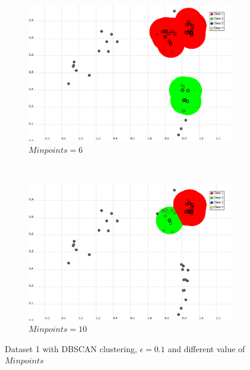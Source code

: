 \documentclass[a4paper,10pt]{article}
\begin{document}
\begin{figure}[H]
\begin{subfigure}[t]{0.2\textwidth}
      \includegraphics[width=\textwidth]{pictures/DBSCAN-epsilon01-Minpoint-6}
      \caption{$Minpoints = 6$}
      \label{fig:DBSCAN-epsilon01-Minpoint-6}
     \end{subfigure}
      ~
    \begin{subfigure}[t]{0.2\textwidth}
      \centering
      \includegraphics[width=\textwidth]{pictures/DBSCAN-epsilon01-Minpoint-10}
      \caption{$Minpoints = 10$}
      \label{fig:DBSCAN-epsilon01-Minpoint-10}
     \end{subfigure}
     \caption{Dataset 1 with DBSCAN clustering, $\epsilon = 0.1 $ and different value of $Minpoints$}
     \label{fig:DBScan_varyminpt}
\end{figure}
\end{document}
